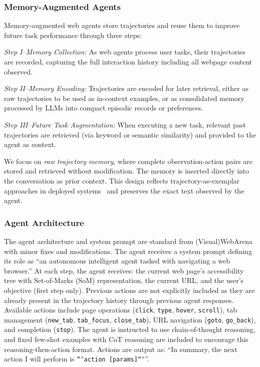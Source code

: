 \documentclass{article} %
\begin{document}
\subsubsection{Memory-Augmented Agents}

Memory-augmented web agents store trajectories and reuse them to improve future task performance through three steps:

\emph{Step I--Memory Collection:} As web agents process user tasks, their trajectories are recorded, capturing the full interaction history including all webpage content observed.

\emph{Step II--Memory Encoding:} Trajectories are encoded for later retrieval, either as raw trajectories to be used as in-context examples, or as consolidated memory processed by LLMs into compact episodic records or preferences.

\emph{Step III--Future Task Augmentation:} When executing a new task, relevant past trajectories are retrieved (via keyword or semantic similarity) and provided to the agent as context.

We focus on \emph{raw trajectory memory}, where complete observation-action pairs are stored and retrieved without modification. The memory is inserted directly into the conversation as prior context. This design reflects trajectory-as-exemplar approaches in deployed systems~\citep{zheng2023synapse} and preserves the exact text observed by the agent.

\subsubsection{Agent Architecture}

The agent architecture and system prompt are standard from (Visual)WebArena~\citep{zhou2023webarena,koh2024visualwebarena} with minor fixes and modifications. The agent receives a system prompt defining its role as ``an autonomous intelligent agent tasked with navigating a web browser.'' At each step, the agent receives: the current web page's accessibility tree with Set-of-Marks (SoM) representation, the current URL, and the user's objective (first step only). Previous actions are not explicitly included as they are already present in the trajectory history through previous agent responses. Available actions include page operations (\texttt{click}, \texttt{type}, \texttt{hover}, \texttt{scroll}), tab management (\texttt{new\_tab}, \texttt{tab\_focus}, \texttt{close\_tab}), URL navigation (\texttt{goto}, \texttt{go\_back}), and completion (\texttt{stop}). The agent is instructed to use chain-of-thought reasoning, and fixed few-shot examples with CoT reasoning are included to encourage this reasoning-then-action format. Actions are output as: ``In summary, the next action I will perform is \texttt{```action [params]```}''.
\end{document}
